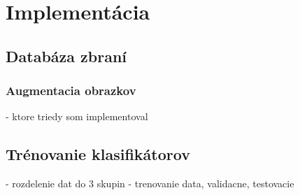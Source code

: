
\chapter{Implementácia}



\section{Databáza zbraní}

\subsection{Augmentacia obrazkov}
- ktore triedy som implementoval


\section{Trénovanie klasifikátorov}
- rozdelenie dat do 3 skupin - trenovanie data, validacne, testovacie
